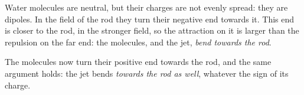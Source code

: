 \begin{abcliste}
\abc Water molecules are neutral, but their charges are not evenly spread: they are dipoles. In the field of the rod they turn their negative end towards it. This end is closer to the rod, in the stronger field, so the attraction on it is larger than the repulsion on the far end: the molecules, and the jet, \emph{bend towards the rod}.

\abc The molecules now turn their positive end towards the rod, and the same argument holds: the jet bends \emph{towards the rod as well}, whatever the sign of its charge.
\end{abcliste}

